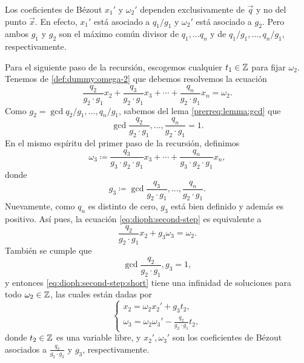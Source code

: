 \begin{observation}
	Los coeficientes de Bézout $x_1'$ y $\omega_2'$ dependen exclusivamente de $\vec{q}$ y no del
	punto $\vec{x}$. En efecto, $x_1'$ está asociado a $q_1/g_1$ y $\omega_2'$ está asociado a
	$g_2$. Pero ambos $g_1$ y $g_2$ son el máximo común divisor de $q_1, \ldots q_n$ y de
	$q_1/g_1, \ldots, q_n/g_1$, respectivamente. 
\end{observation}

Para el siguiente paso de la recursión, escogemos cualquier $t_1 \in \mathbb{Z}$ para fijar $\omega_2$.
Tenemos de \eqref{def:dummy:omega-2} que debemos resolvemos la ecuación
\begin{equation}
	\label{eq:dioph:second-step}
	\frac{q_2}{g_2 \cdot g_1}x_2 +
	\frac{q_3}{g_2 \cdot g_1}x_3 +
	\cdots +
	\frac{q_n}{g_2 \cdot g_1}x_n
	= \omega_2.
\end{equation}
Como $g_2 = \gcd{q_2/g_1, \ldots, q_n/g_1}$, sabemos del lema \ref{prerreq:lemma:gcd}
que
\begin{equation*}
	\gcd{\frac{q_2}{g_2 \cdot g_1}, \ldots, \frac{q_n}{g_2 \cdot g_1}} = 1.
\end{equation*}
En el mismo espíritu del primer paso de la recursión, definimos
\begin{equation*}
	\omega_3 \coloneq \frac{q_3}{g_3 \cdot g_2 \cdot g_1}x_3 + \cdots + \frac{q_n}{g_3
	\cdot g_2 \cdot g_1}x_n,
\end{equation*}
donde
\begin{equation*}
	g_3 \coloneq  \gcd{\frac{q_3}{g_2 \cdot g_1}, \ldots, \frac{q_n}{g_2 \cdot g_1}}.
\end{equation*}
Nuevamente, como $q_n$ es distinto de cero, $g_3$ está bien definido y además es positivo. Así pues,
la ecuación \eqref{eq:dioph:second-step} es equivalente a
\begin{equation}
	\label{eq:dioph:second-step:short}
	\frac{q_2}{g_2 \cdot g_1}x_2 + g_3\omega_3 = \omega_2.
\end{equation}
También se cumple que
\begin{equation*}
	\gcd{\frac{q_2}{g_2 \cdot g_1}, g_3} = 1,
\end{equation*}
y entonces \eqref{eq:dioph:second-step:short} tiene una infinidad de soluciones para todo $\omega_2 \in
\mathbb{Z}$, las cuales están dadas por
\begin{equation*}
	\begin{cases}
		x_2 = \omega_2x_2' + g_3t_2, \\
		\omega_3 = \omega_2\omega_3' - \frac{q_2}{g_2 \cdot g_1}t_2,
	\end{cases}
\end{equation*}
donde $t_2 \in \mathbb{Z}$ es una variable libre, y $x_2', \omega_3'$ son los coeficientes de Bézout
asociados a $\frac{q_2}{g_2 \cdot g_2}$ y $g_3$, respectivamente.

